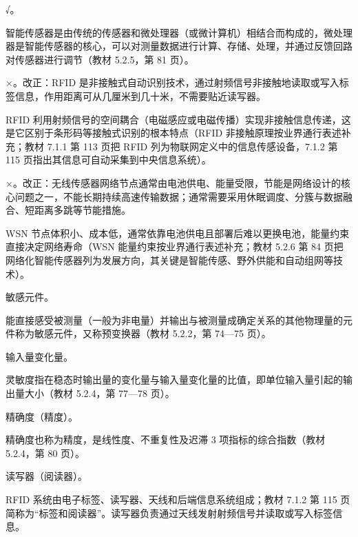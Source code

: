 \documentclass[a4paper,11pt]{article}
\begin{document}
\q √。\begin{analysis}智能传感器是由传统的传感器和微处理器（或微计算机）相结合而构成的，微处理器是智能传感器的核心，可以对测量数据进行计算、存储、处理，并通过反馈回路对传感器进行调节（教材 5.2.5，第 81 页）。\end{analysis}

\q ×。改正：RFID 是非接触式自动识别技术，通过射频信号非接触地读取或写入标签信息，作用距离可从几厘米到几十米，不需要贴近读写器。\begin{analysis}RFID 利用射频信号的空间耦合（电磁感应或电磁传播）实现非接触信息传递，这是它区别于条形码等接触式识别的根本特点（RFID 非接触原理按业界通行表述补充；教材 7.1.1 第 113 页把 RFID 列为物联网定义中的信息传感设备，7.1.2 第 115 页指出其信息可自动采集到中央信息系统）。\end{analysis}

\q ×。改正：无线传感器网络节点通常由电池供电、能量受限，节能是网络设计的核心问题之一，不能长期持续高速传输数据；通常需要采用休眠调度、分簇与数据融合、短距离多跳等节能措施。\begin{analysis}WSN 节点体积小、成本低，通常依靠电池供电且部署后难以更换电池，能量约束直接决定网络寿命（WSN 能量约束按业界通行表述补充；教材 5.2.6 第 84 页把网络化智能传感器列为发展方向，其关键是智能传感、野外供能和自动组网等技术）。\end{analysis}


\q 敏感元件。\begin{analysis}能直接感受被测量（一般为非电量）并输出与被测量成确定关系的其他物理量的元件称为敏感元件，又称预变换器（教材 5.2.2，第 74—75 页）。\end{analysis}

\q 输入量变化量。\begin{analysis}灵敏度指在稳态时输出量的变化量与输入量变化量的比值，即单位输入量引起的输出量大小（教材 5.2.4，第 77—78 页）。\end{analysis}

\q 精确度（精度）。\begin{analysis}精确度也称为精度，是线性度、不重复性及迟滞 3 项指标的综合指数（教材 5.2.4，第 80 页）。\end{analysis}

\q 读写器（阅读器）。\begin{analysis}RFID 系统由电子标签、读写器、天线和后端信息系统组成；教材 7.1.2 第 115 页简称为“标签和阅读器”。读写器负责通过天线发射射频信号并读取或写入标签信息。\end{analysis}
\end{document}
